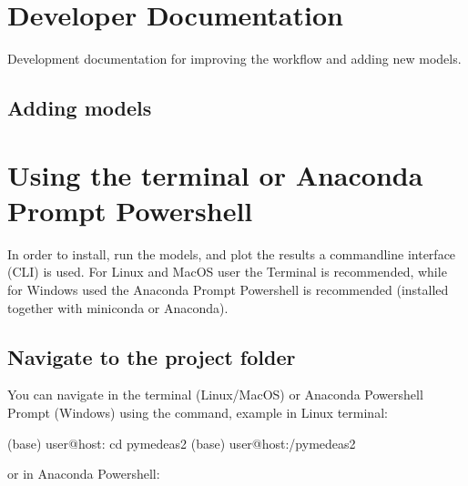 \documentclass[letterpaper,10pt,english]{sphinxmanual}
\begin{document}
\section{Developer Documentation}
\label{\detokenize{development/development_index:developer-documentation}}\label{\detokenize{development/development_index::doc}}
\sphinxAtStartPar
Development documentation for improving the  workflow and adding new models.


\subsection{Adding models}
\label{\detokenize{development/adding_models:adding-models}}\label{\detokenize{development/adding_models::doc}}

\section{Using the terminal or Anaconda Prompt Powershell}
\label{\detokenize{navigating:using-the-terminal-or-anaconda-prompt-powershell}}\label{\detokenize{navigating::doc}}
\sphinxAtStartPar
In order to install, run the models, and plot the results a command\sphinxhyphen{}line interface (CLI) is used. For Linux and MacOS user the Terminal is recommended, while for Windows used the Anaconda Prompt Powershell is recommended (installed together with miniconda or Anaconda).


\subsection{Navigate to the project folder}
\label{\detokenize{navigating:navigate-to-the-project-folder}}
\sphinxAtStartPar
You can navigate in the terminal (Linux/MacOS) or Anaconda Powershell Prompt (Windows) using the  command, example in Linux terminal:

\begin{sphinxVerbatim}[commandchars=\\\{\}]
(base) user@host:\PYGZti{}\PYGZdl{} cd pymedeas2
(base) user@host:\PYGZti{}/pymedeas2\PYGZdl{}
\end{sphinxVerbatim}

\sphinxAtStartPar
or in Anaconda Powershell:

\begin{sphinxVerbatim}[commandchars=\\\{\}]
  \PYGZbs{}\PYGZbs{}  
  \PYGZbs{}\PYGZbs{}\PYGZbs{}
\end{sphinxVerbatim}
\end{document}
